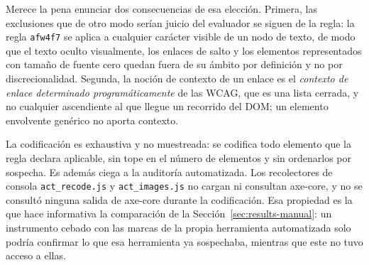 \documentclass[pdflatex,sn-basic,Numbered,iicol]{sn-jnl}
\theoremstyle{thmstyleone}
\theoremstyle{thmstyletwo}
\theoremstyle{thmstylethree}
\begin{document}
Merece la pena enunciar dos consecuencias de esa elecci\'on. Primera, las exclusiones que de otro modo ser\'ian juicio del evaluador se siguen de la regla: la regla \texttt{afw4f7} se aplica a cualquier car\'acter visible de un nodo de texto, de modo que el texto oculto visualmente, los enlaces de salto y los elementos representados con tama\~no de fuente cero quedan fuera de su \'ambito por definici\'on y no por discrecionalidad. Segunda, la noci\'on de contexto de un enlace es el \emph{contexto de enlace determinado program\'aticamente} de las WCAG, que es una lista cerrada, y no cualquier ascendiente al que llegue un recorrido del DOM; un elemento envolvente gen\'erico no aporta contexto.

La codificaci\'on es exhaustiva y no muestreada: se codifica todo elemento que la regla declara aplicable, sin tope en el n\'umero de elementos y sin ordenarlos por sospecha. Es adem\'as ciega a la auditor\'ia automatizada. Los recolectores de consola \texttt{act\_recode.js} y \texttt{act\_images.js} no cargan ni consultan axe-core, y no se consult\'o ninguna salida de axe-core durante la codificaci\'on. Esa propiedad es la que hace informativa la comparaci\'on de la Secci\'on~\ref{sec:results-manual}: un instrumento cebado con las marcas de la propia herramienta automatizada solo podr\'ia confirmar lo que esa herramienta ya sospechaba, mientras que este no tuvo acceso a ellas.
\end{document}
